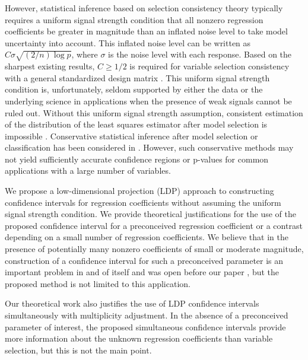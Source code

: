 \documentclass[11pt]{amsart}
\begin{document}
However, statistical inference based on selection consistency theory typically requires a uniform 
signal strength condition that all nonzero regression coefficients be greater in magnitude 
than an inflated noise level to take model uncertainty into account. 
This inflated noise level can be written as $C\sigma\sqrt{(2/n)\log p}$, 
where $\sigma$ is the noise level with each response. 
Based on the sharpest existing results, $C\ge 1/2$ is required for variable selection consistency with a 
general standardized design matrix \cite{Wainwright09b,Zhang10-mc+}.
This uniform signal strength condition is, unfortunately, seldom supported by either the data or the 
underlying science in applications when the presence of weak signals cannot be ruled out. 
Without this uniform signal strength assumption, consistent estimation of the distribution 
of the least squares estimator after model selection is impossible \cite{LeebP06}. 
Conservative statistical inference after model selection or classification has been considered 
in \cite{BerkBZ10,LaberM11}. 
However, such conservative methods 
may not yield sufficiently accurate confidence regions or p-values for common applications 
with a large number of variables.

We propose a low-dimensional projection (LDP) approach to constructing confidence intervals 
for regression coefficients without assuming the uniform signal strength condition. 
We provide theoretical justifications for the use of the proposed confidence interval for a 
preconceived regression coefficient or a contrast depending on a small number of regression coefficients.
We believe that in the presence of potentially many nonzero coefficients {of small or moderate magnitude},
construction of a confidence interval for such a preconceived parameter is an important 
problem in and of itself and was open before our paper \cite{LeebP06}, 
but the proposed method is not limited to this application.

Our theoretical work also justifies the use of LDP confidence intervals simultaneously with 
multiplicity adjustment. 
In the absence of a preconceived parameter of interest, the proposed simultaneous confidence 
intervals provide more information about the unknown regression coefficients than variable selection,
but this is not the main point. 
\end{document}
